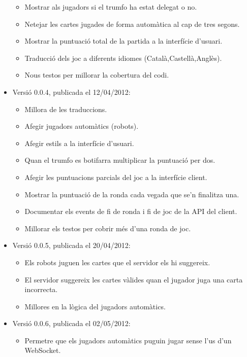 \begin{itemize}
{    \begin{itemize}
        \item{Mostrar als jugadors si el trumfo ha estat delegat o no.}
        \item{Netejar les cartes jugades de forma automàtica al cap de tres segons.}
        \item{Mostrar la puntuació total de la partida a la interfície d'usuari.}
        \item{Traducció dels joc a diferents idiomes (Català,Castellà,Anglès).}
        \item{Nous testos per millorar la cobertura del codi.}
    \end{itemize}
}
\item{Versió 0.0.4, publicada el 12/04/2012: 
    \begin{itemize}
        \item{Millora de les traduccions.}
        \item{Afegir jugadors automàtics (robots).}
        \item{Afegir estils a la interfície d'usuari. }
        \item{Quan el trumfo es botifarra multiplicar la puntuació per dos.}
        \item{Afegir les puntuacions parcials del joc a la interfície client.}
        \item{Mostrar la puntuació de la ronda cada vegada que se'n finalitza una.}
        \item{Documentar els events de fi de ronda i fi de joc de la API del client.}
        \item{Millorar els testos per cobrir més d'una ronda de joc.}
    \end{itemize}
}
\item{Versió 0.0.5, publicada el 20/04/2012:
    \begin{itemize}
        \item{Els robots juguen les cartes que el servidor els hi suggereix.}
        \item{El servidor suggereix les cartes vàlides quan el jugador juga una carta incorrecta.}
        \item{Millores en la lògica del jugadors automàtics.}
    \end{itemize}
}
\item{Versió 0.0.6, publicada el 02/05/2012:
    \begin{itemize}
        \item{Permetre que els jugadors automàtics puguin jugar sense l'us d'un WebSocket.}

\end{itemize}}
\end{itemize}
